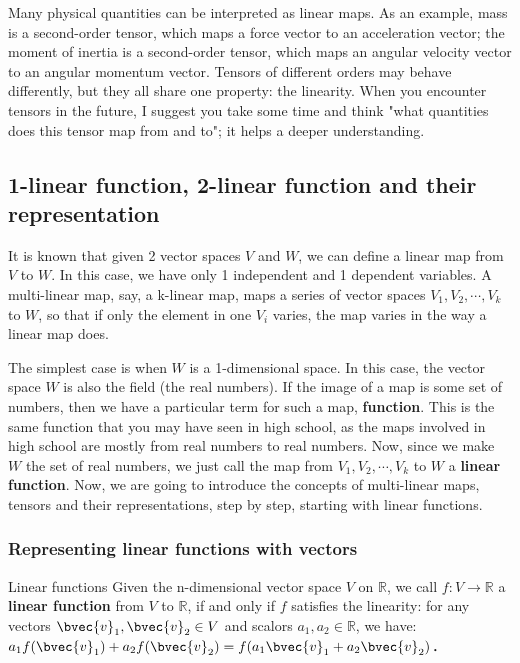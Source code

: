 Many physical quantities can be interpreted as linear maps. As an example, mass is a second-order tensor, which maps a force vector to an acceleration vector; the moment of inertia is a second-order tensor, which maps an angular velocity vector to an angular momentum vector. Tensors of different orders may behave differently, but they all share one property: the linearity. When you encounter tensors in the future, I suggest you take some time and think "what quantities does this tensor map from and to"; it helps a deeper understanding. 



\subsection{1-linear function, 2-linear function and their representation}

It is known that given 2 vector spaces $V$ and $W$, we can define a linear map from $V$ to $W$. In this case, we have only 1 independent and 1 dependent variables. A multi-linear map, say, a k-linear map, maps a series of vector spaces $V_1, V_2, \cdots, V_k$ to $W$, so that if only the element in one $V_i$ varies, the map varies in the way a linear map does. 

The simplest case is when $W$ is a 1-dimensional space. In this case, the vector space $W$ is also the field (the real numbers). If the image of a map is some set of numbers, then we have a particular term for such a map, \textbf{function}. This is the same function that you may have seen in high school, as the maps involved in high school are mostly from real numbers to real numbers. Now, since we make $W$ the set of real numbers, we just call the map from $V_1, V_2, \cdots, V_k$ to $W$ a \textbf{linear function}. Now, we are going to introduce the concepts of multi-linear maps, tensors and their representations, step by step, starting with linear functions. 

\subsubsection{Representing linear functions with vectors}

\begin{definition}{Linear functions}
Given the n-dimensional vector space $V$ on $\mathbb{R}$, we call $f:V\rightarrow \mathbb{R}$ a \textbf{linear function} from $V$ to $\mathbb{R}$, if and only if $f$ satisfies the linearity: for any vectors $\bvec{v}_1, \bvec{v}_2\in V$ and scalors $a_1, a_2\in\mathbb{R}$, we have: $a_1f(\bvec{v}_1)+a_2f(\bvec{v}_2)=f(a_1\bvec{v}_1+a_2\bvec{v}_2)$．
\end{definition}


